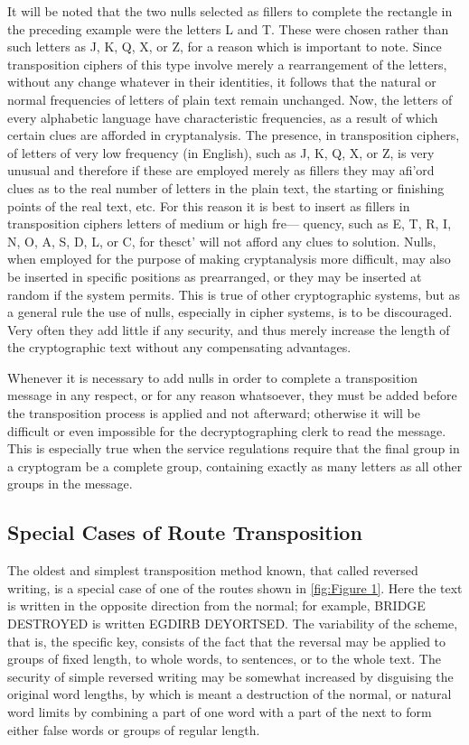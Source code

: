 \mypara It will be noted that the two nulls selected as fillers to complete the
rectangle in the preceding example were the letters L and T. These were
chosen rather than such letters as J, K, Q, X, or Z, for a reason which
is important to note. Since transposition ciphers of this type involve
merely a rearrangement of the letters, without any change whatever in
their identities, it follows that the natural or normal frequencies of letters
of plain text remain unchanged. Now, the letters of every alphabetic
language have characteristic frequencies, as a result of which certain clues
are afforded in cryptanalysis. The presence, in transposition ciphers, of
letters of very low frequency (in English), such as J, K, Q, X, or Z, is
very unusual and therefore if these are employed merely as fillers they
may afi'ord clues as to the real number of letters in the plain text, the
starting or finishing points of the real text, etc. For this reason it is best
to insert as fillers in transposition ciphers letters of medium or high fre—
quency, such as E, T, R, I, N, O, A, S, D, L, or C, for thesct' will not
afford any clues to solution. Nulls, when employed for the purpose of
making cryptanalysis more difficult, may also be inserted in specific positions as prearranged, or they may be inserted at random if the system
permits. This is true of other cryptographic systems, but as a general
rule the use of nulls, especially in cipher systems, is to be discouraged.
Very often they add little if any security, and thus merely increase the
length of the cryptographic text without any compensating advantages.

\mypara Whenever it is necessary to add nulls in order to complete a transposition message in any respect, or for any reason whatsoever, they must
be added before the transposition process is applied and not afterward;
otherwise it will be difficult or even impossible for the decryptographing
clerk to read the message. This is especially true when the service regulations require that the final group in a cryptogram be a complete group,
containing exactly as many letters as all other groups in the message.


\subsection{Special Cases of Route Transposition}

\mypara The oldest and simplest transposition method known, that called reversed writing, is a special case of one of the routes shown in \ref{fig:Figure 1}.
Here the text is written in the opposite direction from the normal; for
example, BRIDGE DESTROYED is written EGDIRB DEYORTSED.
The variability of the scheme, that is, the specific key, consists of the fact
that the reversal may be applied to groups of fixed length, to whole
words, to sentences, or to the whole text. The security of simple reversed
writing may be somewhat increased by disguising the original word
lengths, by which is meant a destruction of the normal, or natural word
limits by combining a part of one word with a part of the next to form
either false words or groups of regular length.


